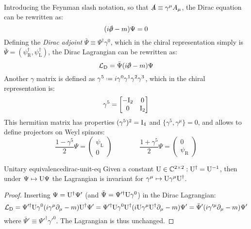 Introducing the Feynman slash notation, so that $ \slashed{A} \equiv \gamma^\mu A_\mu $, the Dirac equation can be rewritten as:
\begin{equation}
  (i \slashed{\pa} - m) \Psi = 0
  \label{eq:1.90}
\end{equation}
Defining the \textit{Dirac adjoint} $ \bar{\Psi} \equiv \Psi^\dagger \gamma^0 $, which in the chiral representation simply is $ \bar{\Psi} = (\psi_\text{R}^\dagger, \psi_\text{L}^\dagger) $, the Dirac Lagrangian can be rewritten as:
\begin{equation}
  \mathcal{L}_\text{D} = \bar{\Psi} (i \slashed{\pa} - m) \Psi
  \label{eq:1.91}
\end{equation}
Another $ \gamma $ matrix is defined as $ \gamma^5 \defeq i \gamma^0 \gamma^1 \gamma^2 \gamma^3 $, which in the chiral representation is:
\begin{equation*}
  \gamma^5 =
  \begin{bmatrix}
    -\mathrm{I}_2 & 0 \\ 0 & \mathrm{I}_2
  \end{bmatrix}
\end{equation*}
This hermitian matrix has properties $ (\gamma^5)^2 = \mathrm{I}_4 $ and $ \{\gamma^5, \gamma^\mu\} = 0 $, and allows to define projectors on Weyl spinors:
\begin{equation}
  \frac{1 - \gamma^5}{2} \Psi =
  \begin{pmatrix}
    \psi_\text{L} \\ 0
  \end{pmatrix}
  \qquad \qquad
  \frac{1 + \gamma^5}{2} \Psi =
  \begin{pmatrix}
    0 \\ \psi_\text{R}
  \end{pmatrix}
  \label{eq:1.92}
\end{equation}

\begin{proposition}{Unitary equivalence}{dirac-unit-eq}
  Given a constant $ \mathrm{U} \in \mathbb{C}^{2 \times 2} : \mathrm{U}^\dagger = \mathrm{U}^{-1} $, then under $ \Psi \mapsto \mathrm{U} \Psi $ the Lagrangian is invariant for $ \gamma^\mu \mapsto \mathrm{U} \gamma^\mu \mathrm{U}^\dagger $.

  \tcblower

  \begin{proof}
    Inserting $ \Psi = \mathrm{U}^\dagger \Psi' $ (and $ \bar{\Psi} = \Psi'^\dagger \mathrm{U} \gamma^0 $) in the Dirac Lagrangian:
    \begin{equation*}
      \mathcal{L}_\text{D} = \Psi'^\dagger \mathrm{U} \gamma^0 (i \gamma^\mu \partial_\mu - m) \mathrm{U}^\dagger \Psi' = \Psi'^\dagger \mathrm{U} \gamma^0 \mathrm{U}^\dagger (i \mathrm{U} \gamma^\mu \mathrm{U}^\dagger \partial_\mu - m) \Psi' = \bar{\Psi}' (i \gamma'^\mu \partial_\mu - m) \Psi'
    \end{equation*}
    where $ \bar{\Psi}' \equiv \Psi'^\dagger \gamma'^0 $. The Lagrangian is thus unchanged.
  \end{proof}
\end{proposition}

